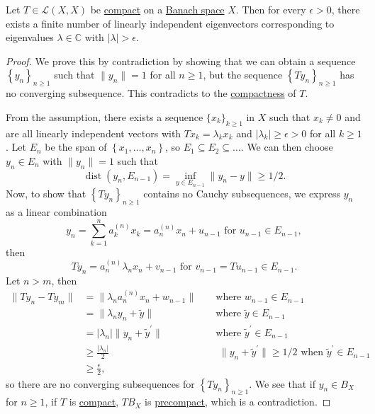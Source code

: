 \begin{theorem}\label{thm:point-spectrum-of-compact-op}
	Let \(T\in \mathcal{L} (X, X)\) be \hyperref[def:compact-op]{compact} on a \hyperref[def:Banach-space]{Banach space} \(X\). Then for every \(\epsilon > 0\), there exists a finite number of linearly independent eigenvectors corresponding to eigenvalues \(\lambda \in \mathbb{C} \) with \(\vert \lambda  \vert > \epsilon \).
\end{theorem}
\begin{proof}
	We prove this by contradiction by showing that we can obtain a sequence \(\left\{ y_n \right\} _{n\geq 1}\) such that \(\lVert y_n \rVert = 1\) for all \(n\geq 1\), but the sequence \(\left\{ Ty_n \right\} _{n\geq 1}\) has no converging subsequence. This contradicts to the \hyperref[def:compact-op]{compactness} of \(T\).

	From the assumption, there exists a sequence \(\{x_k\}_{k\geq 1}\) in \(X\) such that \(x_k \neq 0\) and are all linearly independent vectors with \(Tx_k = \lambda _k x_k\) and \(\vert \lambda _k \vert \geq \epsilon > 0\) for all \(k\geq 1\). Let \(E_n\) be the span of \(\left\{ x_1, \ldots , x_n \right\}\), so \(E_1 \subseteq E_2 \subseteq \ldots \). We can then choose \(y_n \in E_n\) with \(\lVert y_n \rVert = 1\) such that
	\[
		\mathop{\mathrm{dist}}(y_n, E_{n-1}) = \inf _{y\in E_{n-1}} \lVert y_n - y \rVert \geq 1 / 2.
	\]
	Now, to show that \(\left\{ Ty_n \right\} _{n\geq 1}\) contains no Cauchy subsequences, we express \(y_n\) as a linear combination
	\[
		y_n = \sum_{k=1}^{n} a_k^{(n)} x_k = a_n ^{(n)} x_n + u_{n-1} \text{ for \(u_{n-1} \in E_{n-1}\)} ,
	\]
	then
	\[
		Ty_n = a_n^{(n)} \lambda _n x_n + v_{n-1} \text{ for \(v_{n-1} = Tu_{n-1}\in E_{n-1}\)}.
	\]
	Let \(n > m\), then
	\[
		\begin{aligned}
			\lVert Ty_n - Ty_m \rVert
			 & = \lVert \lambda _n a_n ^{(n)} x_n + w_{n-1}\rVert                 &  & \text{ where \(w_{n-1} \in E_{n-1}\)}                                                                       \\
			 & = \lVert \lambda _n y_n + \widetilde{y}  \rVert                    &  & \text{ where \(\widetilde{y} \in E_{n-1}\)}                                                                 \\
			 & = \vert \lambda _n \vert \lVert y_n + \widetilde{y} ^\prime \rVert &  & \text{ where \(\widetilde{y} ^\prime \in E_{n-1}\)}                                                         \\
			 & \geq \frac{\vert \lambda _n \vert }{2}                             &  & \text{ \(\lVert y_n + \widetilde{y} ^\prime  \rVert \geq 1 / 2\) when \(\widetilde{y}^\prime \in E_{n-1}\)} \\
			 & \geq \frac{\epsilon}{2},
		\end{aligned}
	\]
	so there are no converging subsequences for \(\left\{ Ty_n \right\} _{n\geq 1}\). We see that if \(y_n\in B_X\) for \(n\geq 1\), if \(T\) is \hyperref[def:compact-op]{compact}, \(TB_X\) is \hyperref[def:precompact]{precompact}, which is a contradiction.
\end{proof}


